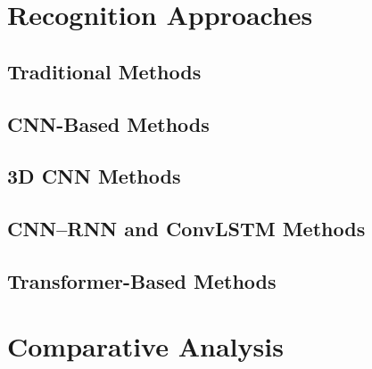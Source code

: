 \documentclass[11pt,a4paper]{article}
\begin{document}
    \section{Recognition Approaches}
    \label{sec:recognition-approaches}

    \subsection{Traditional Methods}
    \label{subsec:traditional-methods}

    \subsection{CNN-Based Methods}
    \label{subsec:cnn-methods}

    \subsection{3D CNN Methods}
    \label{subsec:3d-cnn-methods}

    \subsection{CNN--RNN and ConvLSTM Methods}
    \label{subsec:cnn-rnn-convlstm-methods}

    \subsection{Transformer-Based Methods}
    \label{subsec:transformer-methods}

    \section{Comparative Analysis}
    \label{sec:comparative-analysis}
\end{document}
